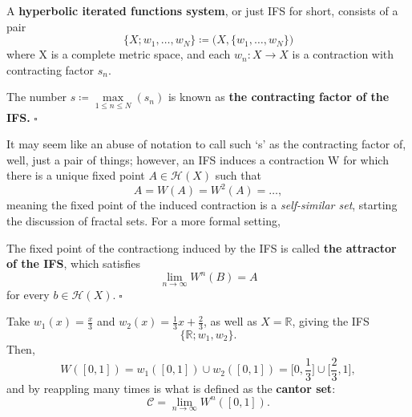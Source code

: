 \documentclass[../fractals_everywhere.tex]{subfiles}
\begin{document}
\begin{def*}
	A \textbf{hyperbolic iterated functions system}, or just IFS for short, consists of a pair
	\[
		\{X; w_{1}, \dotsc , w_{N}\}\coloneqq \biggl(X, \{w_1, \dotsc , w_{N}\}\biggr)
	\]
	where X is a complete metric space, and each \(w_{n}:X\rightarrow X\) is a contraction with contracting factor \(s_{n}\).

	The number \(s\coloneqq \max\limits_{1\leq n\leq N}(s_{n})\) is known as \textbf{the contracting factor of the IFS.} \(\square\)
\end{def*}
It may seem like an abuse of notation to call such `s' as the contracting factor of, well, just a pair of things; however, an IFS induces a contraction W for which there is a unique fixed point \(A\in \mathcal{H}(X)\) such that
\[
	A = W(A) = W^{2}(A)=\dotsc,
\]
meaning the fixed point of the induced contraction is a \textit{self-similar set}, starting the discussion of fractal sets. For a more formal setting,
\begin{def*}
	The fixed point of the contractiong induced by the IFS is called \textbf{the attractor of the IFS}, which satisfies
	\[
		\lim_{n\to \infty}W^{n}(B) = A
	\]
	for every \(b\in \mathcal{H}(X).\; \square\)
\end{def*}
\begin{example}
	Take \(\displaystyle w_1(x) = \frac{x}{3}\) and \(\displaystyle w_2(x) = \frac{1}{3}x+\frac{2}{3}\), as well as \(X = \mathbb{R}\), giving the IFS
	\[
		\{\mathbb{R}; w_1, w_2\}.
	\]
	Then,
	\[
		W([0, 1]) = w_1([0, 1])\cup w_2([0, 1]) = \biggl[0, \frac{1}{3}\biggr]\cup \biggl[\frac{2}{3}, 1\biggr],
	\]
	and by reappling many times is what is defined as the \textbf{cantor set}:
	\[
		\mathcal{C} = \lim_{n\to \infty}W^{n}([0, 1]).
	\]
\end{example}
\end{document}
